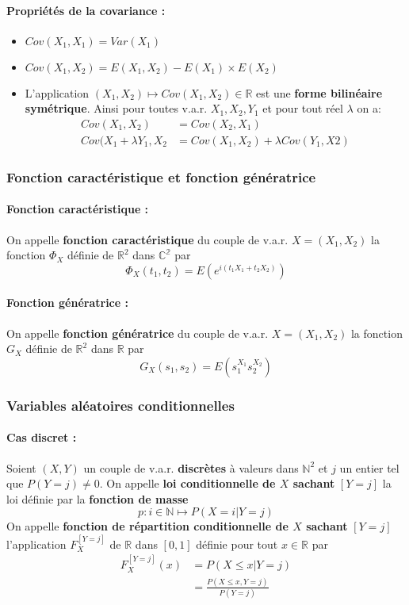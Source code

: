 \documentclass[10pt,a4paper,twoside]{article}
\begin{document}
\paragraph{Propriétés de la covariance :}
\begin{itemize}
\item $Cov(X_{1},X_{1}) = Var(X_{1})$
\item $Cov(X_{1},X_{2}) = E(X_{1},X_{2})-E(X_{1})\times E(X_{2})$
\item L'application $(X_{1},X_{2})\mapsto Cov(X_{1},X_{2}) \in \mathbb{R}$ est une \textbf{forme bilinéaire symétrique}. Ainsi pour toutes v.a.r. $X_{1},X_{2},Y_{1}$ et pour tout réel $\lambda$ on a:
\begin{align*}
Cov(X_{1},X_{2}) &= Cov(X_{2},X_{1})\\
Cov(X_{1}+\lambda Y_{1}, X_{2} &= Cov(X_{1},X_{2})+\lambda Cov(Y_{1},X{2})
\end{align*}
\end{itemize}

\subsubsection{Fonction caractéristique et fonction génératrice}
\paragraph{Fonction caractéristique :} On appelle \textbf{fonction caractéristique} du couple de v.a.r. $X=(X_{1},X_{2})$ la fonction $\Phi_{X}$ définie de $\mathbb{R}^{2}$ dans $\mathbb{C^{2}}$ par
$$\Phi_{X}(t_{1},t_{2})=E\left(e^{i(t_{1}X_{1}+t_{2}X_{2})}\right)$$

\paragraph{Fonction génératrice :} On appelle \textbf{fonction génératrice} du couple de v.a.r. $X=(X_{1},X_{2})$ la fonction $G_{X}$ définie de $\mathbb{R}^{2}$ dans $\mathbb{R}$ par
$$G_{X}(s_{1},s_{2})=E\left(s_{1}^{X_{1}}s_{2}^{X_{2}}\right)$$

\subsubsection{Variables aléatoires conditionnelles}
\paragraph{Cas discret :} Soient $(X,Y)$ un couple de v.a.r. \textbf{discrètes} à valeurs dans $\mathbb{N}^{2}$ et $j$ un entier tel que $P(Y=j)\neq 0$. On appelle \textbf{loi conditionnelle de $X$ sachant} $[Y=j]$ la loi définie par la \textbf{fonction de masse}
$$p:i\in \mathbb{N} \longmapsto P(X=i|Y=j)$$
On appelle \textbf{fonction de répartition conditionnelle de $X$ sachant} $[Y=j]$ l'application $F_{X}^{[Y=j]}$ de $\mathbb{R}$ dans $[0,1]$ définie pour tout $x\in \mathbb{R}$ par
\begin{align*}
F_{X}^{[Y=j]}(x)&=P(X\leqslant x|Y=j)\\
&=\frac{P(X\leqslant x,Y=j)}{P(Y=j)}
\end{align*}
\end{document}
